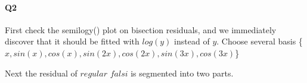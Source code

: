\documentclass[11pt]{article}
\begin{document}
\paragraph{Q2}
First check the semilogy() plot on bisection residuals, and we immediately discover that it should be fitted with $log(y)$ instead of $y$. Choose several basis \{$x,sin(x),cos(x),sin(2x),cos(2x),sin(3x),cos(3x)$\}
\begin{figure}[H]
	\centering
\end{figure}
Next the residual of $regular$ $falsi$ is segmented into two parts.
\begin{figure}[H]
	\centering
\end{figure}
\end{document}

